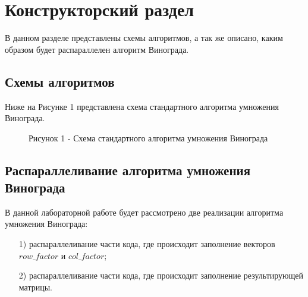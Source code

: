 \documentclass[14pt, a4paper]{extarticle}
\begin{document}
	
	\clearpage
	\section{Конструкторский раздел}
	В данном разделе представлены схемы алгоритмов, а так же описано, каким образом будет распараллелен алгоритм Винограда. 
	
	\subsection{Схемы алгоритмов}
	Ниже на Рисунке 1 представлена схема стандартного алгоритма умножения Винограда.
	\begin{figure}[h!]
		\caption*{Рисунок 1 - Схема стандартного алгоритма умножения Винограда}
	\end{figure}
	
	\subsection{Распараллеливание алгоритма умножения Винограда}
	В данной лабораторной работе будет рассмотрено две реализации алгоритма умножения Винограда:
	\begin{itemize}
		\item[1)] распараллеливание части кода, где происходит заполнение векторов $row\_factor$ и $col\_factor$;
		\item[2)] распараллеливание части кода, где происходит заполнение результирующей матрицы.
		
	\end{itemize}
	
\end{document}
